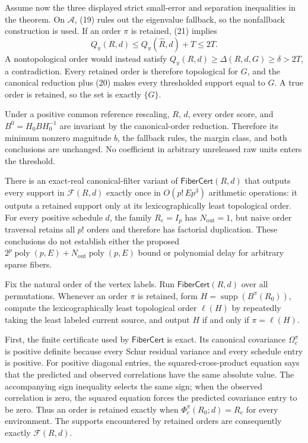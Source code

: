 Assume now the three displayed strict small-error and separation inequalities in the theorem.  On \(\mathcal A\), (19) rules out the eigenvalue fallback, so the nonfallback construction is used.  If an order \(\pi\) is retained, (21) implies
\[
 Q_\pi(R,d)\le Q_\pi(\widehat R,d)+T\le2T.
\]
A nontopological order would instead satisfy
\(Q_\pi(R,d)\ge\Delta(R,d,G)\ge\delta>2T\), a contradiction.  Every retained order is therefore topological for \(G\), and the canonical reduction plus (20) makes every thresholded support equal to \(G\).  A true order is retained, so the set is exactly \(\{G\}\).

Under a positive common reference rescaling, \(R\), \(d\), every order score, and \(B^0=H_0BH_0^{-1}\) are invariant by the canonical-order reduction.  Therefore its minimum nonzero magnitude \(b\), the fallback rules, the margin class, and both conclusions are unchanged.  No coefficient in arbitrary unreleased raw units enters the threshold.

There is an exact-real canonical-filter variant of \(\mathsf{FiberCert}(R,d)\) that outputs every support in \(\mathcal F(R,d)\) exactly once in \(O(p!\,E p^3)\) arithmetic operations: it outputs a retained support only at its lexicographically least topological order.  For every positive schedule \(d\), the family \(R_e=I_p\) has \(N_{\mathrm{out}}=1\), but naive order traversal retains all \(p!\) orders and therefore has factorial duplication.  These conclusions do not establish either the proposed \(2^p\operatorname{poly}(p,E)+N_{\mathrm{out}}\operatorname{poly}(p,E)\) bound or polynomial delay for arbitrary sparse fibers.

Fix the natural order of the vertex labels.  Run \(\mathsf{FiberCert}(R,d)\) over all permutations.  Whenever an order \(\pi\) is retained, form
\(H=\operatorname{supp}(B^\pi(R_0))\), compute the lexicographically least topological order \(\ell(H)\) by repeatedly taking the least labeled current source, and output \(H\) if and only if \(\pi=\ell(H)\).

First, the finite certificate used by \(\mathsf{FiberCert}\) is exact.  Its canonical covariance \(\Omega_e^\pi\) is positive definite because every Schur residual variance and every schedule entry is positive.  For positive diagonal entries, the squared-cross-product equation says that the predicted and observed correlations have the same absolute value.  The accompanying sign inequality selects the same sign; when the observed correlation is zero, the squared equation forces the predicted covariance entry to be zero.  Thus an order is retained exactly when \(\Phi_e^\pi(R_0;d)=R_e\) for every environment.  The supports encountered by retained orders are consequently exactly \(\mathcal F(R,d)\).

